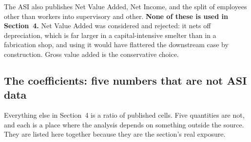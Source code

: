 \documentclass[11pt, a4paper]{article}
\begin{document}
\noindent The ASI also publishes Net Value Added, Net Income, and the split of
employees other than workers into supervisory and other. \textbf{None of these is used
in Section~4.} Net Value Added was considered and rejected: it nets off depreciation,
which is far larger in a capital-intensive smelter than in a fabrication shop, and
using it would have flattered the downstream case by construction. Gross value added
is the conservative choice.

\subsection{The coefficients: five numbers that are not ASI data}

Everything else in Section~4 is a ratio of published cells. Five quantities are not,
and each is a place where the analysis depends on something outside the source. They
are listed here together because they are the section's real exposure.
\end{document}
